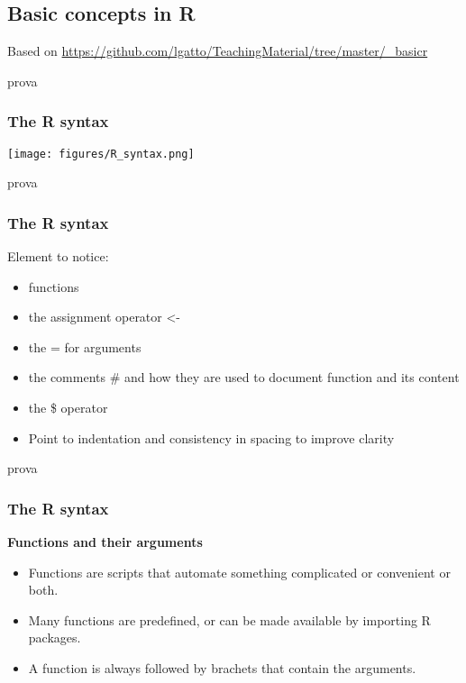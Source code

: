 \documentclass{beamer}
\begin{document}
\begin{frame}
\section{Basic concepts in R}
\vspace{30pt}
\scriptsize
\begin{flushright}  Based on \url{https://github.com/lgatto/TeachingMaterial/tree/master/\_basicr} \end{flushright}
\end{frame}

\begin{frame}[fragile]{prova}
	\frametitle{The R syntax}
	\begin{center} \texttt{[image: figures/R\_syntax.png]} \end{center}
\end{frame}

\begin{frame}[fragile]{prova}
	\frametitle{The R syntax}
	Element to notice:
	\begin{itemize}
		\item functions
		\item the assignment operator <-
		\item the = for arguments
		\item the comments \# and how they are used to document function and its content
		\item the \$ operator
		\item Point to indentation and consistency in spacing to improve clarity
	\end{itemize}
\end{frame}

\begin{frame}[fragile]{prova}
	\frametitle{The R syntax}
	{\bf Functions and their arguments}
	\begin{itemize}
		\item Functions are scripts that automate something complicated or convenient or both.
		\item Many functions are predefined, or can be made available by importing R packages.
		\item A function is always followed by brachets that contain the arguments.
	\end{itemize}
\end{frame}
\end{document}
